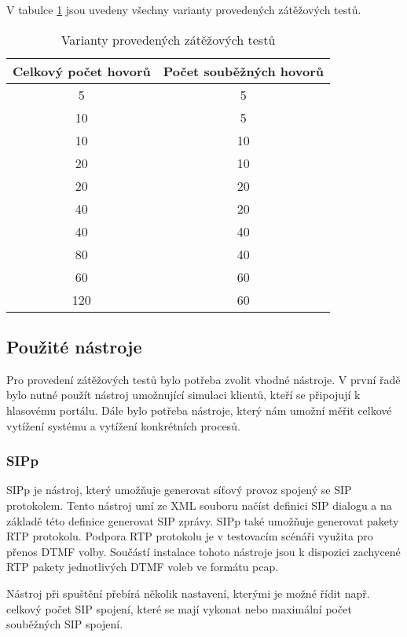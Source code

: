 \documentclass[ing,male,java,dept460,twoside]{diploma}						%
\begin{document}
V tabulce \ref{tab:Benchmark_variants} jsou uvedeny všechny varianty provedených zátěžových testů.

\begin{table}
	\centering
	\begin{tabular}{|c|c|}
		\hline
		Celkový počet hovorů & Počet souběžných hovorů \\
		\hline
		5 & 5  \\
		\hline
		10 & 5  \\
		\hline
		10 & 10  \\
		\hline
		20 & 10  \\
		\hline
		20 & 20  \\
		\hline
		40 & 20  \\
		\hline
		40 & 40  \\
		\hline
		80 & 40  \\
		\hline
		60 & 60  \\
		\hline
		120 & 60  \\
		\hline
	\end{tabular}
	\caption{Varianty provedených zátěžových testů}
	\label{tab:Benchmark_variants}
\end{table}


\subsection{Použité nástroje}
Pro provedení zátěžových testů bylo potřeba zvolit vhodné nástroje. V první řadě bylo nutné použít nástroj umožnující simulaci klientů, kteří se připojují k hlasovému portálu. Dále bylo potřeba nástroje, který nám umožní měřit celkové vytížení systému a vytížení konkrétních procesů.

\subsubsection{SIPp}
SIPp je nástroj, který umožňuje generovat síťový provoz spojený se SIP protokolem. Tento nástroj umí ze XML souboru načíst definici SIP dialogu a na základě této definice generovat SIP zprávy. SIPp také umožňuje generovat pakety RTP protokolu. Podpora RTP protokolu je v testovacím scénáři využita pro přenos DTMF volby. Součástí instalace tohoto nástroje jsou k dispozici zachycené RTP pakety jednotlivých DTMF voleb ve formátu pcap.

Nástroj při spuštění přebírá několik nastavení, kterými je možné řídit např. celkový počet SIP spojení, které se mají vykonat nebo maximální počet souběžných SIP spojení.
\end{document}
